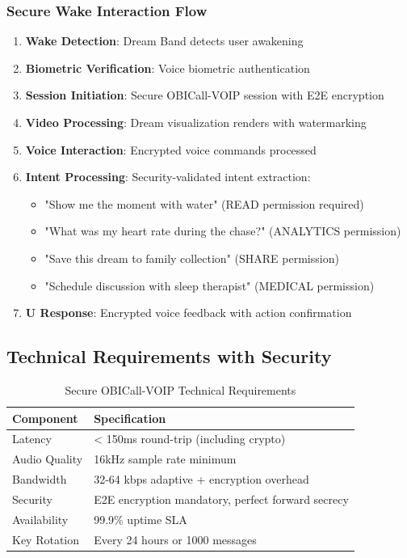 \documentclass[12pt,a4paper]{article}
\begin{document}
\subsubsection{Secure Wake Interaction Flow}

\begin{enumerate}
    \item \textbf{Wake Detection}: Dream Band detects user awakening
    \item \textbf{Biometric Verification}: Voice biometric authentication
    \item \textbf{Session Initiation}: Secure OBICall-VOIP session with E2E encryption
    \item \textbf{Video Processing}: Dream visualization renders with watermarking
    \item \textbf{Voice Interaction}: Encrypted voice commands processed
    \item \textbf{Intent Processing}: Security-validated intent extraction:
    \begin{itemize}
        \item "Show me the moment with water" (READ permission required)
        \item "What was my heart rate during the chase?" (ANALYTICS permission)
        \item "Save this dream to family collection" (SHARE permission)
        \item "Schedule discussion with sleep therapist" (MEDICAL permission)
    \end{itemize}
    \item \textbf{U Response}: Encrypted voice feedback with action confirmation
\end{enumerate}

\subsection{Technical Requirements with Security}

\begin{table}[h]
\centering
\begin{tabular}{|l|l|}
\hline
\textbf{Component} & \textbf{Specification} \\
\hline
Latency & < 150ms round-trip (including crypto) \\
\hline
Audio Quality & 16kHz sample rate minimum \\
\hline
Bandwidth & 32-64 kbps adaptive + encryption overhead \\
\hline
Security & E2E encryption mandatory, perfect forward secrecy \\
\hline
Availability & 99.9\% uptime SLA \\
\hline
Key Rotation & Every 24 hours or 1000 messages \\
\hline
\end{tabular}
\caption{Secure OBICall-VOIP Technical Requirements}
\end{table}
\end{document}
